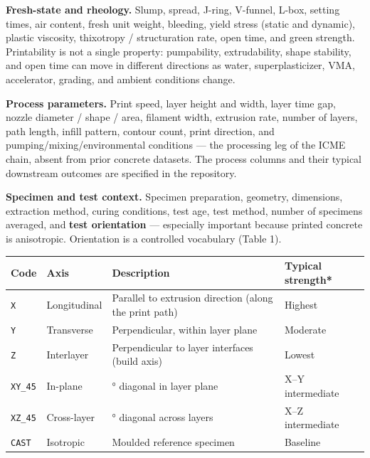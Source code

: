 \documentclass[
  11pt,
  letterpaper,
]{article}
\newcounter{none} %
\begin{document}
\textbf{Fresh-state and rheology.} Slump, spread, J-ring, V-funnel,
L-box, setting times, air content, fresh unit weight, bleeding, yield
stress (static and dynamic), plastic viscosity, thixotropy /
structuration rate, open time, and green strength. Printability is not a
single property: pumpability, extrudability, shape stability, and open
time can move in different directions as water, superplasticizer, VMA,
accelerator, grading, and ambient conditions change.

\textbf{Process parameters.} Print speed, layer height and width, layer
time gap, nozzle diameter / shape / area, filament width, extrusion
rate, number of layers, path length, infill pattern, contour count,
print direction, and pumping/mixing/environmental conditions --- the
processing leg of the ICME chain, absent from prior concrete datasets.
The process columns and their typical downstream outcomes are specified
in the repository.

\textbf{Specimen and test context.} Specimen preparation, geometry,
dimensions, extraction method, curing conditions, test age, test method,
number of specimens averaged, and \textbf{test orientation} ---
especially important because printed concrete is anisotropic.
Orientation is a controlled vocabulary (Table 1).

{\def\LTcaptype{none} %
\begin{longtable}[]{@{}
  >{\raggedright\arraybackslash}p{}
  >{\raggedright\arraybackslash}p{}
  >{\raggedright\arraybackslash}p{}
  >{\raggedright\arraybackslash}p{}@{}}
\toprule\noalign{}
\begin{minipage}[b]{\linewidth}\raggedright
Code
\end{minipage} & \begin{minipage}[b]{\linewidth}\raggedright
Axis
\end{minipage} & \begin{minipage}[b]{\linewidth}\raggedright
Description
\end{minipage} & \begin{minipage}[b]{\linewidth}\raggedright
Typical strength*
\end{minipage} \\
\midrule\noalign{}
\endhead
\bottomrule\noalign{}
\endlastfoot
\texttt{X} & Longitudinal & Parallel to extrusion direction (along the
print path) & Highest \\
\texttt{Y} & Transverse & Perpendicular, within layer plane &
Moderate \\
\texttt{Z} & Interlayer & Perpendicular to layer interfaces (build axis)
& Lowest \\
\texttt{XY\_45} & In-plane & 45° diagonal in layer plane & X--Y
intermediate \\
\texttt{XZ\_45} & Cross-layer & 45° diagonal across layers & X--Z
intermediate \\
\texttt{CAST} & Isotropic & Moulded reference specimen & Baseline \\
\end{longtable}
}
\end{document}
